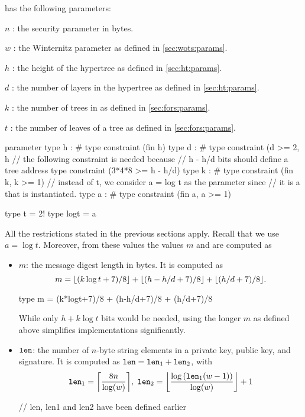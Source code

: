 \spx has the following parameters:
\begin{description}
 \item  $n$ : the security parameter in bytes.
 \item  $w$ : the Winternitz parameter as defined in \autoref{sec:wots:params}.
 \item  $h$ : the height of the hypertree as defined in \autoref{sec:ht:params}.
 \item  $d$ : the number of layers in the hypertree as defined in \autoref{sec:ht:params}.
 \item  $k$ : the number of trees in \fors as defined in \autoref{sec:fors:params}.
 \item  $t$ : the number of leaves of a \fors tree as defined in \autoref{sec:fors:params}.
\end{description}

\begin{code}
  parameter
    type h : #
    type constraint (fin h)
    type d : #
    type constraint (d >= 2, h%
    // the following constraint is needed because
    // h - h/d bits should define a tree address
    type constraint (3*4*8 >= h - h/d)
    type k : #
    type constraint (fin k, k >= 1)
    // instead of t, we consider a = log t as the parameter since
    // it is a that is instantiated.
    type a : #
    type constraint (fin a, a >= 1)

  type t = 2^^a
  type logt = a
\end{code}

All the restrictions stated in the previous sections apply. Recall that 
we use $a = \log t$. Moreover, from these values the values $m$ and \len are
computed as
\begin{itemize}
  \item $m$: the message digest length in bytes. 
  It is computed as 
  $$m=\lfloor(k\log t +7)/ 8\rfloor + \lfloor(h - h/d +7)/ 8\rfloor + \lfloor(h / d +7)/ 8\rfloor.$$

\begin{code}
  type m = (k*logt+7)/8 + (h-h/d+7)/8 + (h/d+7)/8
\end{code}

  While only $h + k\log t$ bits would be needed, using the longer $m$ as defined 
  above simplifies implementations significantly.
  \item $\texttt{len}$: the number of $n$-byte string elements in a \wotsp private
        key, public key, and signature. It is computed as $\texttt{len} =
        \texttt{len}_1 + \texttt{len}_2$, with
        \begin{equation*}
          \len_1 = \ceil*{\frac{8n}{\log(w)}},\
          \len_2 = \floor*{\frac{\log{(\len_1(w - 1))}}{\log(w)}} + 1
        \end{equation*}

\begin{code}
  // len, len1 and len2 have been defined earlier
\end{code}
\end{itemize}

